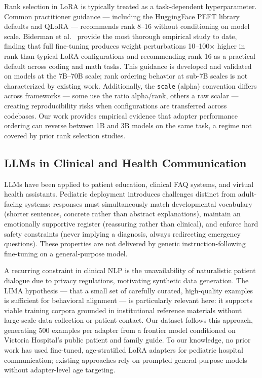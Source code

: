 \documentclass[journal]{IEEEtai}
\begin{document}
Rank selection in LoRA is typically treated as a task-dependent hyperparameter. Common practitioner guidance --- including the HuggingFace PEFT library defaults and QLoRA \cite{dettmers2023qlora} --- recommends rank 8--16 without conditioning on model scale. Biderman et al.~\cite{biderman2024lora} provide the most thorough empirical study to date, finding that full fine-tuning produces weight perturbations 10--100$\times$ higher in rank than typical LoRA configurations and recommending rank 16 as a practical default across coding and math tasks. This guidance is developed and validated on models at the 7B--70B scale; rank ordering behavior at sub-7B scales is not characterized by existing work. Additionally, the \texttt{scale} (alpha) convention differs across frameworks --- some use the ratio alpha/rank, others a raw scalar --- creating reproducibility risks when configurations are transferred across codebases. Our work provides empirical evidence that adapter performance ordering can reverse between 1B and 3B models on the same task, a regime not covered by prior rank selection studies.

\subsection{LLMs in Clinical and Health Communication}

LLMs have been applied to patient education, clinical FAQ systems, and virtual health assistants. Pediatric deployment introduces challenges distinct from adult-facing systems: responses must simultaneously match developmental vocabulary (shorter sentences, concrete rather than abstract explanations), maintain an emotionally supportive register (reassuring rather than clinical), and enforce hard safety constraints (never implying a diagnosis, always redirecting emergency questions). These properties are not delivered by generic instruction-following fine-tuning on a general-purpose model.

A recurring constraint in clinical NLP is the unavailability of naturalistic patient dialogue due to privacy regulations, motivating synthetic data generation. The LIMA hypothesis \cite{zhou2023lima} --- that a small set of carefully curated, high-quality examples is sufficient for behavioral alignment --- is particularly relevant here: it supports viable training corpora grounded in institutional reference materials without large-scale data collection or patient contact. Our dataset follows this approach, generating 500 examples per adapter from a frontier model conditioned on Victoria Hospital's public patient and family guide. To our knowledge, no prior work has used fine-tuned, age-stratified LoRA adapters for pediatric hospital communication; existing approaches rely on prompted general-purpose models without adapter-level age targeting.
\end{document}
